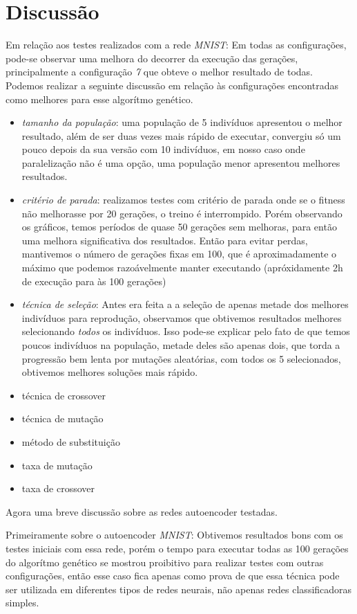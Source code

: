 \documentclass[twoside,conference,a4paper]{IEEEtran}
\begin{document}
\section{Discussão}
Em relação aos testes realizados com a rede \emph{MNIST}:
Em todas as configurações, pode-se observar uma melhora do decorrer da execução das gerações, principalmente a configuração \emph{7} que obteve o melhor resultado de todas.
Podemos realizar a seguinte discussão em relação às configurações encontradas como melhores para esse algorítmo genético.

\begin{itemize}
    \item \emph{tamanho da população}: uma população de 5 indivíduos apresentou o melhor resultado, além de ser duas vezes mais rápido de executar, convergiu só um pouco depois da sua versão com 10 indivíduos, em nosso caso onde paralelização não é uma opção, uma população menor apresentou melhores resultados.
    \item \emph{critério de parada}: realizamos testes com critério de parada onde se o fitness não melhorasse por 20 gerações, o treino é interrompido. Porém observando os gráficos, temos períodos de quase 50 gerações sem melhoras, para então uma melhora significativa dos resultados. Então para evitar perdas, mantivemos o número de gerações fixas em 100, que é aproximadamente o máximo que podemos razoávelmente manter executando (apróxidamente 2h de execução para às 100 gerações)
    \item \emph{técnica de seleção}: Antes era feita a a seleção de apenas metade dos melhores indivíduos para reprodução, observamos que obtivemos resultados melhores selecionando \emph{todos} os indivíduos. Isso pode-se explicar pelo fato de que temos poucos indivíduos na população, metade deles são apenas dois, que torda a progressão bem lenta por mutações aleatórias, com todos os 5 selecionados, obtivemos melhores soluções mais rápido.
    \item técnica de crossover
    \item técnica de mutação
    \item método de substituição
    \item taxa de mutação
    \item taxa de crossover
\end{itemize}

Agora uma breve discussão sobre as redes autoencoder testadas. 

Primeiramente sobre o autoencoder \emph{MNIST}: Obtivemos resultados bons com os testes iniciais com essa rede, porém o tempo para executar todas as 100 gerações do algorítmo genético se mostrou proibitivo para realizar testes com outras configurações, então esse caso fica apenas como prova de que essa técnica pode ser utilizada em diferentes tipos de redes neurais, não apenas redes classificadoras simples.
\end{document}

